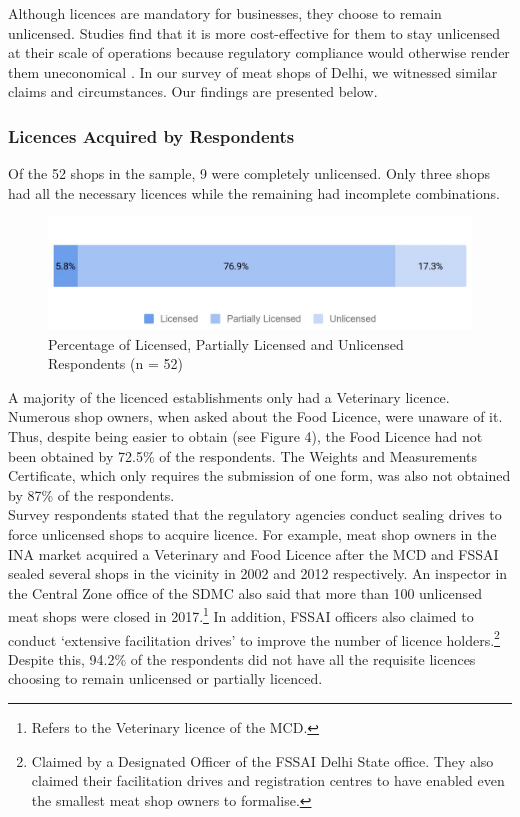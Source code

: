 \documentclass[a4paper, 12pt]{article}
\begin{document}
Although licences are mandatory for businesses, they choose to remain unlicensed. Studies find that it is more cost-effective for them to stay unlicensed at their scale of operations because regulatory compliance would otherwise render them uneconomical \parencite{desotopaper} \parencite{duttapaper} \parencite{laportapaper}. In our survey of meat shops of Delhi, we witnessed similar claims and circumstances. Our findings are presented below. \\

\subsubsection{Licences Acquired by Respondents}
Of the 52 shops in the sample, 9 were completely unlicensed. Only three shops had all the necessary licences while the remaining had incomplete combinations.\\

\begin{figure}[H]
\centering
\includegraphics[width=5.5in]{Fig 3.jpg}
\caption{Percentage of Licensed, Partially Licensed and Unlicensed Respondents (n = 52)}
\end{figure} 



A majority of the licenced establishments only had a Veterinary licence. Numerous shop owners, when asked about the Food Licence, were unaware of it. Thus, despite being easier to obtain (see Figure 4), the Food Licence had not been obtained by 72.5\% of the respondents. The Weights and Measurements Certificate, which only requires the submission of one form, was also not obtained by 87\% of the respondents. \\

Survey respondents stated that the regulatory agencies conduct sealing drives to force unlicensed shops to acquire licence. For example, meat shop owners in the INA market acquired a Veterinary and Food Licence after the MCD and FSSAI sealed several shops in the vicinity in 2002 and 2012 respectively. An inspector in the Central Zone office of the SDMC also said that more than 100 unlicensed meat shops were closed in 2017.\footnote{ Refers to the Veterinary licence of the MCD.} In addition, FSSAI officers also claimed to conduct ‘extensive facilitation drives’ to improve the number of licence holders.\footnote{Claimed by a Designated Officer of the FSSAI Delhi State office. They also claimed their facilitation drives and registration centres to have enabled even the smallest meat shop owners to formalise.}
Despite this, 94.2\% of the respondents did not have all the requisite licences choosing to remain unlicensed or partially licenced.\\
\end{document}
